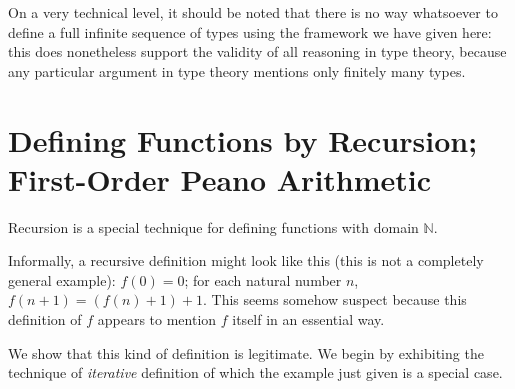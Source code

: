 \documentclass[12pt]{book}
\begin{document}
On a very technical level, it should be noted that there is no way whatsoever to define a full infinite sequence of types using the framework we have given here:  this does nonetheless support the validity of all reasoning in type theory, because any particular argument in type theory mentions only finitely many types.

\newpage

\section{Defining Functions by Recursion; First-Order Peano Arithmetic}

Recursion is a special technique for defining functions with domain
$\mathbb N$.

Informally, a recursive definition might look like this (this is not a
completely general example): $f(0) = 0$; for each natural number $n$,
$f(n+1)=(f(n)+1)+1$.  This seems somehow suspect because this
definition of $f$ appears to mention $f$ itself in an essential way.

We show that this kind of definition is legitimate.  We begin by
exhibiting the technique of {\em iterative\/} definition of which the
example just given is a special case.
\end{document}
